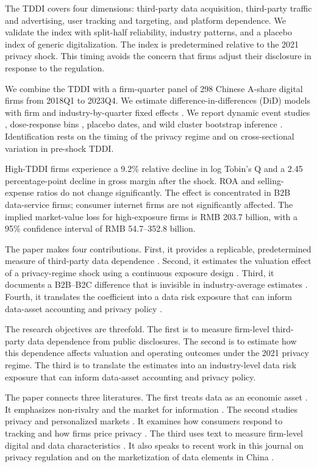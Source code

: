 The TDDI covers four dimensions: third-party data acquisition, third-party traffic and advertising, user tracking and targeting, and platform dependence. We validate the index with split-half reliability, industry patterns, and a placebo index of generic digitalization. The index is predetermined relative to the 2021 privacy shock. This timing avoids the concern that firms adjust their disclosure in response to the regulation.

We combine the TDDI with a firm-quarter panel of 298 Chinese A-share digital firms from 2018Q1 to 2023Q4. We estimate difference-in-differences (DiD) models with firm and industry-by-quarter fixed effects \cite{dechaisemartin2020}. We report dynamic event studies \cite{rambachan2023}, dose-response bins \cite{callaway2024}, placebo dates, and wild cluster bootstrap inference \cite{mackinnon2017}. Identification rests on the timing of the privacy regime and on cross-sectional variation in pre-shock TDDI.

High-TDDI firms experience a 9.2\% relative decline in log Tobin's Q and a 2.45 percentage-point decline in gross margin after the shock. ROA and selling-expense ratios do not change significantly. The effect is concentrated in B2B data-service firms; consumer internet firms are not significantly affected. The implied market-value loss for high-exposure firms is RMB 203.7 billion, with a 95\% confidence interval of RMB 54.7--352.8 billion.

The paper makes four contributions. First, it provides a replicable, predetermined measure of third-party data dependence \cite{gentzkow2019}. Second, it estimates the valuation effect of a privacy-regime shock using a continuous exposure design \cite{aridor2024}. Third, it documents a B2B--B2C difference that is invisible in industry-average estimates \cite{chen2026}. Fourth, it translates the coefficient into a data risk exposure that can inform data-asset accounting and privacy policy \cite{ma2025}.

The research objectives are threefold. The first is to measure firm-level third-party data dependence from public disclosures. The second is to estimate how this dependence affects valuation and operating outcomes under the 2021 privacy regime. The third is to translate the estimates into an industry-level data risk exposure that can inform data-asset accounting and privacy policy.

The paper connects three literatures. The first treats data as an economic asset \cite{jones2020}. It emphasizes non-rivalry \cite{farboodi2020} and the market for information \cite{bergemann2019}. The second studies privacy and personalized markets \cite{acquisti2016}. It examines how consumers respond to tracking \cite{tucker2014} and how firms price privacy \cite{johnson2020}. The third uses text to measure firm-level digital and data characteristics \cite{gentzkow2019}. It also speaks to recent work in this journal on privacy regulation \cite{chen2026,li2026,kang2025,lin2021,zhang2026} and on the marketization of data elements in China \cite{jin2026,ma2025,song2025}.

